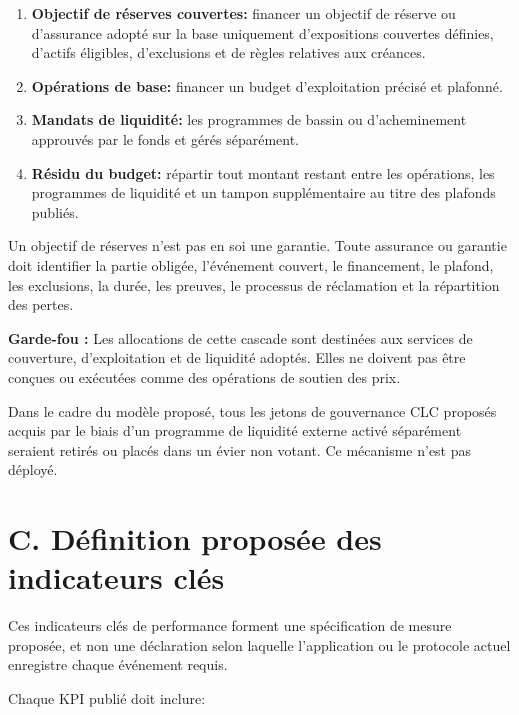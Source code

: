 \documentclass[11pt]{article}
\begin{document}
\begin{enumerate}[leftmargin=*]
\item \textbf{Objectif de réserves couvertes:} financer un objectif de réserve ou d'assurance adopté sur la base uniquement d'expositions couvertes définies, d'actifs éligibles, d'exclusions et de règles relatives aux créances.
\item \textbf{Opérations de base:} financer un budget d'exploitation précisé et plafonné.
\item \textbf{Mandats de liquidité:} les programmes de bassin ou d'acheminement approuvés par le fonds et gérés séparément.
\item \textbf{Résidu du budget:} répartir tout montant restant entre les opérations, les programmes de liquidité et un tampon supplémentaire au titre des plafonds publiés.
\end{enumerate}
Un objectif de réserves n'est pas en soi une garantie. Toute assurance ou garantie doit identifier la partie obligée, l'événement couvert, le financement, le plafond, les exclusions, la durée, les preuves, le processus de réclamation et la répartition des pertes.

\textbf{Garde-fou :} Les allocations de cette cascade sont destinées aux services de couverture, d'exploitation et de liquidité adoptés. Elles ne doivent pas être conçues ou exécutées comme des opérations de soutien des prix.

Dans le cadre du modèle proposé, tous les jetons de gouvernance CLC proposés acquis par le biais d'un programme de liquidité externe activé séparément seraient retirés ou placés dans un évier non votant. Ce mécanisme n'est pas déployé.


\section*{C. Définition proposée des indicateurs clés}

Ces indicateurs clés de performance forment une spécification de mesure proposée, et non une déclaration selon laquelle l'application ou le protocole actuel enregistre chaque événement requis.

Chaque KPI publié doit inclure:
\end{document}
